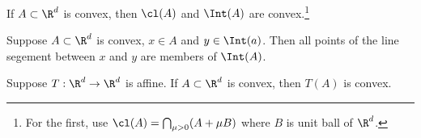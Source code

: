 \begin{proposition}
If $A \subset \R ^d$ is convex, then $\cl(A)$ and $\Int(A)$ are convex.\footnote{For the first, use $\cl(A) = \bigcap_{\mu  > 0} (A + \mu B)$ where $B$ is unit ball of $\R ^d$.}
\end{proposition}

\begin{proposition}
Suppose $A \subset \R ^d$ is convex, $x \in A$ and $y \in \Int(a)$.
Then all points of the line segement between $x$ and $y$ are members of $\Int(A)$.
\end{proposition}

\begin{proposition}
Suppose $T: \R ^d \to \R ^d$ is affine.
If $A \subset \R ^d$ is convex, then $T(A)$ is convex.
\end{proposition}

\blankpage